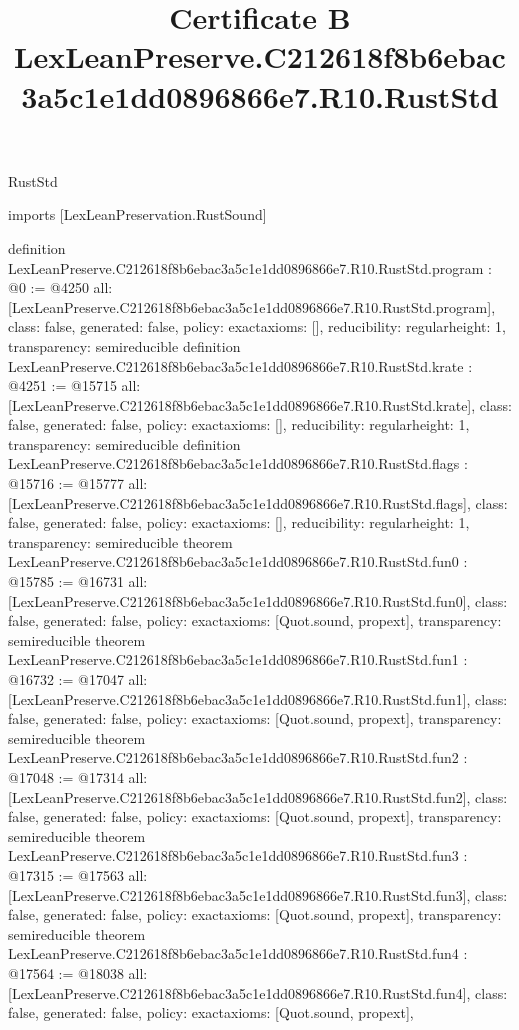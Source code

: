\begin{lexlean}{RustStd}
\title{Certificate B LexLeanPreserve.C212618f8b6ebac3a5c1e1dd0896866e7.R10.RustStd}
\begin{coremodule}
imports [LexLeanPreservation.RustSound]

definition LexLeanPreserve.C212618f8b6ebac3a5c1e1dd0896866e7.R10.RustStd.program : @0 := @4250 {
  all: [LexLeanPreserve.C212618f8b6ebac3a5c1e1dd0896866e7.R10.RustStd.program],
  class: false,
  generated: false,
  policy: exact{axioms: []},
  reducibility: regular{height: 1},
  transparency: semireducible
}
definition LexLeanPreserve.C212618f8b6ebac3a5c1e1dd0896866e7.R10.RustStd.krate : @4251 := @15715 {
  all: [LexLeanPreserve.C212618f8b6ebac3a5c1e1dd0896866e7.R10.RustStd.krate],
  class: false,
  generated: false,
  policy: exact{axioms: []},
  reducibility: regular{height: 1},
  transparency: semireducible
}
definition LexLeanPreserve.C212618f8b6ebac3a5c1e1dd0896866e7.R10.RustStd.flags : @15716 := @15777 {
  all: [LexLeanPreserve.C212618f8b6ebac3a5c1e1dd0896866e7.R10.RustStd.flags],
  class: false,
  generated: false,
  policy: exact{axioms: []},
  reducibility: regular{height: 1},
  transparency: semireducible
}
theorem LexLeanPreserve.C212618f8b6ebac3a5c1e1dd0896866e7.R10.RustStd.fun0 : @15785 := @16731 {
  all: [LexLeanPreserve.C212618f8b6ebac3a5c1e1dd0896866e7.R10.RustStd.fun0],
  class: false,
  generated: false,
  policy: exact{axioms: [Quot.sound, propext]},
  transparency: semireducible
}
theorem LexLeanPreserve.C212618f8b6ebac3a5c1e1dd0896866e7.R10.RustStd.fun1 : @16732 := @17047 {
  all: [LexLeanPreserve.C212618f8b6ebac3a5c1e1dd0896866e7.R10.RustStd.fun1],
  class: false,
  generated: false,
  policy: exact{axioms: [Quot.sound, propext]},
  transparency: semireducible
}
theorem LexLeanPreserve.C212618f8b6ebac3a5c1e1dd0896866e7.R10.RustStd.fun2 : @17048 := @17314 {
  all: [LexLeanPreserve.C212618f8b6ebac3a5c1e1dd0896866e7.R10.RustStd.fun2],
  class: false,
  generated: false,
  policy: exact{axioms: [Quot.sound, propext]},
  transparency: semireducible
}
theorem LexLeanPreserve.C212618f8b6ebac3a5c1e1dd0896866e7.R10.RustStd.fun3 : @17315 := @17563 {
  all: [LexLeanPreserve.C212618f8b6ebac3a5c1e1dd0896866e7.R10.RustStd.fun3],
  class: false,
  generated: false,
  policy: exact{axioms: [Quot.sound, propext]},
  transparency: semireducible
}
theorem LexLeanPreserve.C212618f8b6ebac3a5c1e1dd0896866e7.R10.RustStd.fun4 : @17564 := @18038 {
  all: [LexLeanPreserve.C212618f8b6ebac3a5c1e1dd0896866e7.R10.RustStd.fun4],
  class: false,
  generated: false,
  policy: exact{axioms: [Quot.sound, propext]},
}
\end{coremodule}
\end{lexlean}
